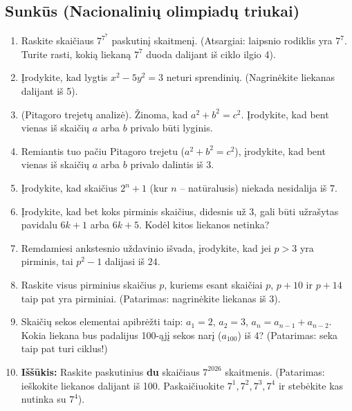 \documentclass[11pt,a4paper]{scrartcl}
\begin{document}
\subsection*{Sunkūs (Nacionalinių olimpiadų triukai)}
\setcounter{enumi}{20}
\begin{enumerate}
    \item Raskite skaičiaus \(7^{7^7}\) paskutinį skaitmenį. (Atsargiai: laipsnio rodiklis yra \(7^7\). Turite rasti, kokią liekaną \(7^7\) duoda dalijant iš ciklo ilgio 4).
    \item Įrodykite, kad lygtis \(x^2 - 5y^2 = 3\) neturi sprendinių. (Nagrinėkite liekanas dalijant iš 5).
    \item (Pitagoro trejetų analizė). Žinoma, kad \(a^2 + b^2 = c^2\). Įrodykite, kad bent vienas iš skaičių \(a\) arba \(b\) privalo būti lyginis.
    \item Remiantis tuo pačiu Pitagoro trejetu (\(a^2 + b^2 = c^2\)), įrodykite, kad bent vienas iš skaičių \(a\) arba \(b\) privalo dalintis iš 3.
    \item Įrodykite, kad skaičius \(2^n + 1\) (kur \(n\) – natūralusis) niekada nesidalija iš $7$.
    \item Įrodykite, kad bet koks pirminis skaičius, didesnis už $3$, gali būti užrašytas pavidalu \(6k+1\) arba \(6k+5\). Kodėl kitos liekanos netinka?
    \item Remdamiesi ankstesnio uždavinio išvada, įrodykite, kad jei $p > 3$ yra pirminis, tai \(p^2 - 1\) dalijasi iš $24$.
    \item Raskite visus pirminius skaičius \(p\), kuriems esant skaičiai \(p\), \(p+10\) ir \(p+14\) taip pat yra pirminiai. (Patarimas: nagrinėkite liekanas iš 3).
    \item Skaičių sekos elementai apibrėžti taip: \(a_1 = 2\), \(a_2 = 3\), \(a_n = a_{n-1} + a_{n-2}\). Kokia liekana bus padalijus 100-ąjį sekos narį (\(a_{100}\)) iš 4? (Patarimas: seka taip pat turi ciklus!)
    \item \textbf{Iššūkis:} Raskite paskutinius \textbf{du} skaičiaus \(7^{2026}\) skaitmenis. (Patarimas: ieškokite liekanos dalijant iš 100. Paskaičiuokite \(7^1, 7^2, 7^3, 7^4\) ir stebėkite kas nutinka su \(7^4\)).
\end{enumerate}
\end{document}

